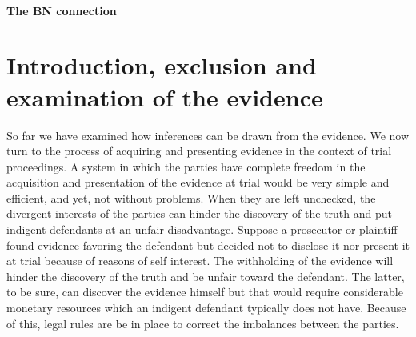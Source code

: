 \documentclass[10pt]{article}
\begin{document}
\paragraph{The BN connection}


\section{Introduction, exclusion and examination of the evidence}
\label{sec:intexc}

So far we have examined how inferences can be drawn from the evidence.
We now turn to the process of acquiring and presenting evidence in the 
context of trial proceedings. 
A system in which the parties have complete 
 freedom in the acquisition and presentation 
 of the evidence at trial would be very simple and 
 efficient, and yet, not without problems.  
When they are left unchecked, the divergent interests of the parties %
can hinder the discovery of the truth and put indigent defendants at an unfair disadvantage.
Suppose a prosecutor or plaintiff found evidence favoring the defendant but decided not to disclose it nor present it at trial because of reasons of self interest. The withholding of the evidence will hinder the discovery of the truth and be unfair toward the defendant. The latter, to be sure, can discover the evidence himself but that would require considerable monetary resources which an indigent defendant typically does not have. 
Because of this, legal rules are be in place to correct the imbalances between the parties.
\end{document}
